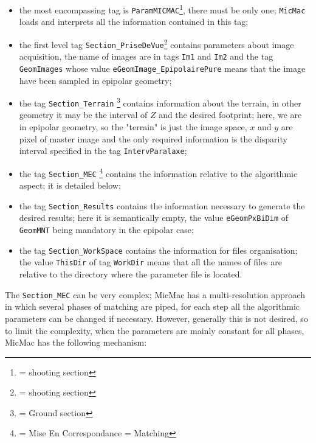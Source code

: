 \begin{itemize}
   \item  the most encompassing tag is {\tt ParamMICMAC}\footnote{= shooting section },
   		 there must be only one;
          {\tt MicMac} loads and interprets all the information contained in this tag;

   \item the first level tag {\tt Section\_PriseDeVue}\footnote{= shooting section }
         contains parameters about
         image acquisition,  the name of images are in tags 
         {\tt Im1} and {\tt Im2} and the tag {\tt GeomImages} whose value
         {\tt eGeomImage\_EpipolairePure} means that the image have been sampled
         in epipolar geometry;

    \item the tag {\tt Section\_Terrain} \footnote{= Ground section} contains information
          about the terrain, in other geometry it may be the interval of $Z$ and the desired
          footprint; here, we are in epipolar geometry, so the "terrain" is just the image space,
          $x$ and $y$ are pixel of master image and the only required information  is the disparity 
           interval specified in the tag {\tt IntervParalaxe};

 
    \item the tag {\tt Section\_MEC} \footnote{= Mise En Correspondance = Matching} contains the
          information relative to the algorithmic aspect; it is detailed below;

    \item  the tag {\tt Section\_Results} contains the information necessary to generate the  desired results; here it is semantically
           empty, the value {\tt eGeomPxBiDim} of {\tt GeomMNT} being mandatory in the epipolar case;

    \item the tag {\tt Section\_WorkSpace} contains the information for files organisation;
           the value {\tt ThisDir} of tag {\tt WorkDir} means that all the names of files are
           relative to the directory where the parameter file is located.

\end{itemize}


The  {\tt Section\_MEC} can be very complex; MicMac has a multi-resolution approach in which
several phases of matching are piped, for each step all the algorithmic parameters can be changed if necessary. 
However, generally this is not desired, so to limit the complexity,
when the parameters are mainly constant for all phases,  MicMac has the following mechanism:


